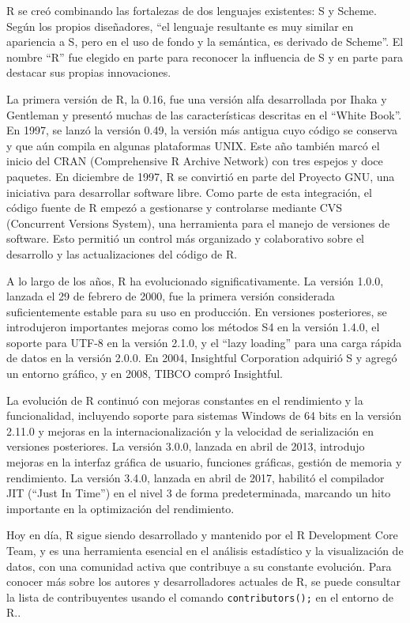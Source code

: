 \documentclass[
  letterpaper,
  DIV=11,
  numbers=noendperiod]{scrreprt}
\begin{document}
R se creó combinando las fortalezas de dos lenguajes existentes: S y
Scheme. Según los propios diseñadores, ``el lenguaje resultante es muy
similar en apariencia a S, pero en el uso de fondo y la semántica, es
derivado de Scheme''. El nombre ``R'' fue elegido en parte para
reconocer la influencia de S y en parte para destacar sus propias
innovaciones.

La primera versión de R, la 0.16, fue una versión alfa desarrollada por
Ihaka y Gentleman y presentó muchas de las características descritas en
el ``White Book''. En 1997, se lanzó la versión 0.49, la versión más
antigua cuyo código se conserva y que aún compila en algunas plataformas
UNIX. Este año también marcó el inicio del CRAN (Comprehensive R Archive
Network) con tres espejos y doce paquetes. En diciembre de 1997, R se
convirtió en parte del Proyecto GNU, una iniciativa para desarrollar
software libre. Como parte de esta integración, el código fuente de R
empezó a gestionarse y controlarse mediante CVS (Concurrent Versions
System), una herramienta para el manejo de versiones de software. Esto
permitió un control más organizado y colaborativo sobre el desarrollo y
las actualizaciones del código de R.

A lo largo de los años, R ha evolucionado significativamente. La versión
1.0.0, lanzada el 29 de febrero de 2000, fue la primera versión
considerada suficientemente estable para su uso en producción. En
versiones posteriores, se introdujeron importantes mejoras como los
métodos S4 en la versión 1.4.0, el soporte para UTF-8 en la versión
2.1.0, y el ``lazy loading'' para una carga rápida de datos en la
versión 2.0.0. En 2004, Insightful Corporation adquirió S y agregó un
entorno gráfico, y en 2008, TIBCO compró Insightful.

La evolución de R continuó con mejoras constantes en el rendimiento y la
funcionalidad, incluyendo soporte para sistemas Windows de 64 bits en la
versión 2.11.0 y mejoras en la internacionalización y la velocidad de
serialización en versiones posteriores. La versión 3.0.0, lanzada en
abril de 2013, introdujo mejoras en la interfaz gráfica de usuario,
funciones gráficas, gestión de memoria y rendimiento. La versión 3.4.0,
lanzada en abril de 2017, habilitó el compilador JIT (``Just In Time'')
en el nivel 3 de forma predeterminada, marcando un hito importante en la
optimización del rendimiento.

Hoy en día, R sigue siendo desarrollado y mantenido por el R Development
Core Team, y es una herramienta esencial en el análisis estadístico y la
visualización de datos, con una comunidad activa que contribuye a su
constante evolución. Para conocer más sobre los autores y
desarrolladores actuales de R, se puede consultar la lista de
contribuyentes usando el comando \texttt{contributors();} en el entorno
de R..
\end{document}
